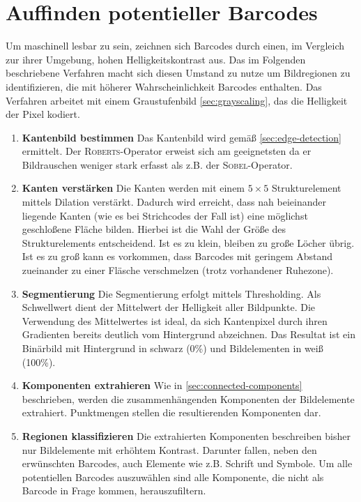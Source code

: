 \section{Auffinden potentieller Barcodes}
\label{sec:candidate-extraction}
\writtenby{\dcauthornameewie}%
Um maschinell lesbar zu sein, zeichnen sich Barcodes durch einen, im Vergleich zur ihrer Umgebung, hohen Helligkeitskontrast aus.
Das im Folgenden beschriebene Verfahren macht sich diesen Umstand zu nutze um Bildregionen zu identifizieren, die mit höherer Wahrscheinlichkeit Barcodes enthalten.
Das Verfahren arbeitet mit einem Graustufenbild \autoref{sec:grayscaling}, das die Helligkeit der Pixel kodiert.

\begin{enumerate}[(1)]
\item \textbf{Kantenbild bestimmen}
Das Kantenbild wird gemäß \autoref{sec:edge-detection} ermittelt.
Der \textsc{Roberts}-Operator erweist sich am geeignetsten da er Bildrauschen weniger stark erfasst als z.B. der \textsc{Sobel}-Operator.

\item \textbf{Kanten verstärken}
Die Kanten werden mit einem $5\times5$ Strukturelement mittels Dilation verstärkt.
Dadurch wird erreicht, dass nah beieinander liegende Kanten (wie es bei Strichcodes der Fall ist) eine möglichst geschloßene Fläche bilden.
Hierbei ist die Wahl der Größe des Strukturelements entscheidend.
Ist es zu klein, bleiben zu große Löcher übrig.
Ist es zu groß kann es vorkommen, dass Barcodes mit geringem Abstand zueinander zu einer Fläsche verschmelzen (trotz vorhandener Ruhezone).

\item \textbf{Segmentierung}
Die Segmentierung erfolgt mittels Thresholding.
Als Schwellwert dient der Mittelwert der Helligkeit aller Bildpunkte.
Die Verwendung des Mittelwertes ist ideal, da sich Kantenpixel durch ihren Gradienten bereits deutlich vom Hintergrund abzeichnen.
Das Resultat ist ein Binärbild mit Hintergrund in schwarz (0\%) und Bildelementen in weiß (100\%).

\item \textbf{Komponenten extrahieren}
Wie in \autoref{sec:connected-components} beschrieben, werden die zusammenhängenden Komponenten der Bildelemente extrahiert.
Punktmengen stellen die resultierenden Komponenten dar.

\item \textbf{Regionen klassifizieren}
Die extrahierten Komponenten beschreiben bisher nur Bildelemente mit erhöhtem Kontrast.
Darunter fallen, neben den erwünschten Barcodes, auch Elemente wie z.B. Schrift und Symbole.
Um alle potentiellen Barcodes auszuwählen sind alle Komponente, die nicht als Barcode in Frage kommen, herauszufiltern.


\end{enumerate}
